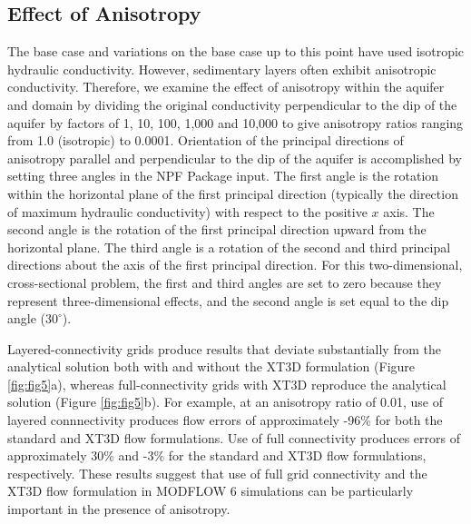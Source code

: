 \documentclass{article}
\begin{document}
\subsection*{Effect of Anisotropy}

The base case and variations on the base case up to this point have used isotropic hydraulic conductivity. However, sedimentary layers often exhibit anisotropic conductivity. Therefore, we examine the effect of anisotropy within the aquifer and domain by dividing the original conductivity perpendicular to the dip of the aquifer by factors of 1, 10, 100, 1,000 and 10,000 to give anisotropy ratios ranging from 1.0 (isotropic) to 0.0001. Orientation of the principal directions of anisotropy parallel and perpendicular to the dip of the aquifer is accomplished by setting three angles in the NPF Package input. The first angle is the rotation within the horizontal plane of the first principal direction (typically the direction of maximum hydraulic conductivity) with respect to the positive $x$ axis. The second angle is the rotation of the first principal direction upward from the horizontal plane. The third angle is a rotation of the second and third principal directions about the axis of the first principal direction. For this two-dimensional, cross-sectional problem, the first and third angles are set to zero because they represent three-dimensional effects, and the second angle is set equal to the dip angle ($30^{\circ}$).

Layered-connectivity grids produce results that deviate substantially from the analytical solution both with and without the XT3D formulation (Figure \ref{fig:fig5}a), whereas full-connectivity grids with XT3D reproduce the analytical solution (Figure \ref{fig:fig5}b). For example, at an anisotropy ratio of 0.01, use of layered connnectivity produces flow errors of approximately -96\% for both the standard and XT3D flow formulations. Use of full connectivity produces errors of approximately 30\% and -3\% for the standard and XT3D flow formulations, respectively. These results suggest that use of full grid connectivity and the XT3D flow formulation in MODFLOW 6 simulations can be particularly important in the presence of anisotropy.
\end{document}
